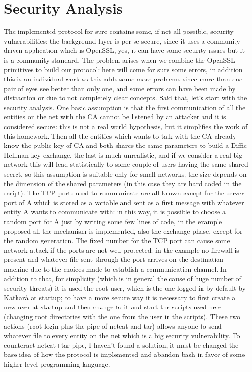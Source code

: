 \documentclass{article}
\begin{document}
\section{Security Analysis}
\label{sec:secAn}

The implemented protocol for sure contains some, if not all possible, security vulnerabilities: the background layer is per se secure, since it uses a community driven application which is OpenSSL, yes, it can have some security issues but it is a community standard. The problem arises when we combine the OpenSSL primitives to build our protocol: here will come for sure some errors, in addition this is an individual work so this adds some more problems since more than one pair of eyes see better than only one, and some errors can have been made by distraction or due to not completely clear concepts. Said that, let's start with the security analysis. \newline
One basic assumption is that the first communication of all the entities on the net with the CA cannot be listened by an attacker and it is considered secure: this is not a real world hypothesis, but it simplifies the work of this homework. Then all the entities which wants to talk with the CA already know the public key of CA and both shares the same parameters to build a Diffie Hellman key exchange, the last is much unrealistic, and if we consider a real big network this will lead statistically to some couple of users having the same shared secret, so this assumption is suitable only for small networks; the size depends on the dimension of the shared parameters (in this case they are hard coded in the script).\newline
The TCP ports used to communicate are all known except for the server port of A which is stored as a variable and sent as a first message with whatever entity A wants to communicate with: in this way, it is possible to choose a random port for A just by writing some few lines of code, in the example proposed all the mechanism is implemented, also the exchange phase, except for the random generation. The fixed number for the TCP port can cause some network attack if the ports are not well protected: in the example no firewall is present and whatever file sent through the port arrives on the destination machine due to the choices made to establish a communication channel. In addition to that, for simplicity (which is in general the cause of huge number of security threats) it is used the root user, which is the one logged in by default by Katharà at startup; to have a more secure way it is necessary to first create a new user at startup and then change to it and start the scripts used here (changing root directories with the one from the user in the scripts). These two actions (root login plus the pipe of netcat and tar) allows anyone to send whatever file to every entity on the net which is a big security vulnerability. To counteract netcat+tar pipe, I haven't found a solution, it must be changed the base idea of how the protocol is implemented and abandon bash in favor of some higher level programming language.\newline
\end{document}
